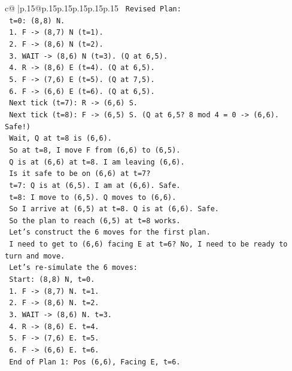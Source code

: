 \documentclass{article}
\begin{document}
{\begin{supertabular}{c@{$\;$}|p{.15\linewidth}@{}p{.15\linewidth}p{.15\linewidth}p{.15\linewidth}p{.15\linewidth}p{.15\linewidth}}
{{{\texttt{     Revised Plan:} \\
\texttt{     t=0: (8,8) N.} \\
\texttt{     1. F {-}> (8,7) N (t=1).} \\
\texttt{     2. F {-}> (8,6) N (t=2).} \\
\texttt{     3. WAIT {-}> (8,6) N (t=3). (Q at 6,5).} \\
\texttt{     4. R {-}> (8,6) E (t=4). (Q at 6,5).} \\
\texttt{     5. F {-}> (7,6) E (t=5). (Q at 7,5).} \\
\texttt{     6. F {-}> (6,6) E (t=6). (Q at 6,5).} \\
\texttt{     Next tick (t=7): R {-}> (6,6) S.} \\
\texttt{     Next tick (t=8): F {-}> (6,5) S. (Q at 6,5? 8 mod 4 = 0 {-}> (6,6). Safe!)} \\
\texttt{     Wait, Q at t=8 is (6,6).} \\
\texttt{     So at t=8, I move F from (6,6) to (6,5).} \\
\texttt{     Q is at (6,6) at t=8. I am leaving (6,6).} \\
\texttt{     Is it safe to be on (6,6) at t=7?} \\
\texttt{     t=7: Q is at (6,5). I am at (6,6). Safe.} \\
\texttt{     t=8: I move to (6,5). Q moves to (6,6).} \\
\texttt{     So I arrive at (6,5) at t=8. Q is at (6,6). Safe.} \\
\texttt{     So the plan to reach (6,5) at t=8 works.} \\
\texttt{     Let's construct the 6 moves for the first plan.} \\
\texttt{     I need to get to (6,6) facing E at t=6? No, I need to be ready to turn and move.} \\
\texttt{     Let's re{-}simulate the 6 moves:} \\
\texttt{     Start: (8,8) N, t=0.} \\
\texttt{     1. F {-}> (8,7) N. t=1.} \\
\texttt{     2. F {-}> (8,6) N. t=2.} \\
\texttt{     3. WAIT {-}> (8,6) N. t=3.} \\
\texttt{     4. R {-}> (8,6) E. t=4.} \\
\texttt{     5. F {-}> (7,6) E. t=5.} \\
\texttt{     6. F {-}> (6,6) E. t=6.} \\
\texttt{     End of Plan 1: Pos (6,6), Facing E, t=6.} \\
}}}
\end{supertabular}}
\end{document}
